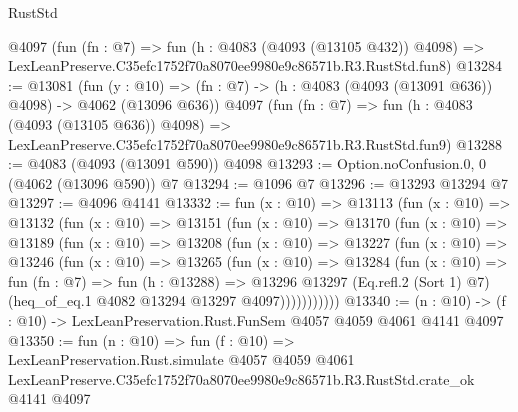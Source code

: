 \begin{lexlean}{RustStd}
\begin{coremodule}
    @4097
    (fun (fn : @7) =>
    fun (h : @4083 (@4093 (@13105 @432)) @4098) =>
    LexLeanPreserve.C35efc1752f70a8070ee9980e9c86571b.R3.RustStd.fun8)
@13284 := @13081
    (fun (y : @10) => (fn : @7) -> (h : @4083 (@4093 (@13091 @636)) @4098) -> @4062 (@13096 @636))
    @4097
    (fun (fn : @7) =>
    fun (h : @4083 (@4093 (@13105 @636)) @4098) =>
    LexLeanPreserve.C35efc1752f70a8070ee9980e9c86571b.R3.RustStd.fun9)
@13288 := @4083 (@4093 (@13091 @590)) @4098
@13293 := Option.noConfusion.{0, 0} (@4062 (@13096 @590)) @7
@13294 := @1096 @7
@13296 := @13293 @13294 @7
@13297 := @4096 @4141
@13332 := fun (x : @10) =>
  @13113
    (fun (x : @10) =>
    @13132
      (fun (x : @10) =>
      @13151
        (fun (x : @10) =>
        @13170
          (fun (x : @10) =>
          @13189
            (fun (x : @10) =>
            @13208
              (fun (x : @10) =>
              @13227
                (fun (x : @10) =>
                @13246
                  (fun (x : @10) =>
                  @13265
                    (fun (x : @10) =>
                    @13284
                      (fun (x : @10) =>
                      fun (fn : @7) =>
                      fun (h : @13288) =>
                      @13296
                        @13297
                        (Eq.refl.{2} (Sort 1) @7)
                        (heq_of_eq.{1} @4082 @13294 @13297 @4097)))))))))))
@13340 := (n : @10) -> (f : @10) -> LexLeanPreservation.Rust.FunSem @4057 @4059 @4061 @4141 @4097
@13350 := fun (n : @10) =>
  fun (f : @10) =>
  LexLeanPreservation.Rust.simulate
    @4057
    @4059
    @4061
    LexLeanPreserve.C35efc1752f70a8070ee9980e9c86571b.R3.RustStd.crate_ok
    @4141
    @4097
\end{coremodule}
\end{lexlean}
